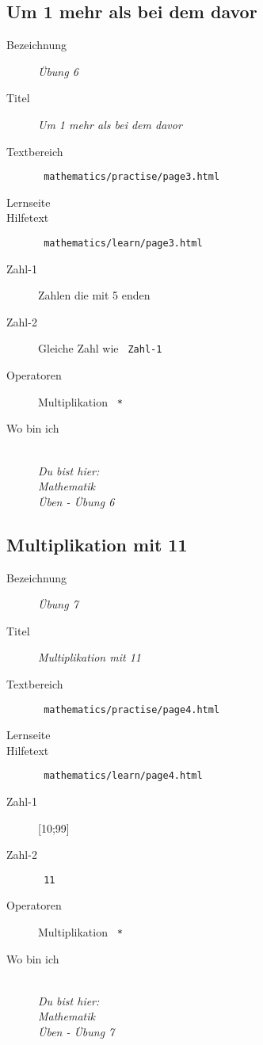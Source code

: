\subsection{ Um 1 mehr als bei dem davor }
\label{cha:math-practise-page6}
\begin{description}
  \item[Bezeichnung] \emph{ Übung 6 }
  \item[Titel] \emph{ Um 1 mehr als bei dem davor }
  \item[Textbereich] \texttt{ mathematics/practise/page3.html }
  \item[Lernseite] 
  \item[Hilfetext] \texttt{ mathematics/learn/page3.html }
  \item[Zahl-1] Zahlen die mit 5 enden
  \item[Zahl-2] Gleiche Zahl wie \texttt{ Zahl-1 }
  \item[Operatoren] Multiplikation \texttt{ * }
  \item[Wo bin ich] \emph{\\Du bist hier:\\Mathematik\\Üben - Übung 6}
\end{description}


\subsection{ Multiplikation mit 11 }
\label{cha:math-practise-page7}
\begin{description}
  \item[Bezeichnung] \emph{ Übung 7 }
  \item[Titel] \emph{ Multiplikation mit 11 }
  \item[Textbereich] \texttt{ mathematics/practise/page4.html }
  \item[Lernseite] 
  \item[Hilfetext] \texttt{ mathematics/learn/page4.html }
  \item[Zahl-1] [10;99]
  \item[Zahl-2] \texttt{ 11 }
  \item[Operatoren] Multiplikation \texttt{ * }
  \item[Wo bin ich] \emph{\\Du bist hier:\\Mathematik\\Üben - Übung 7}
\end{description}


